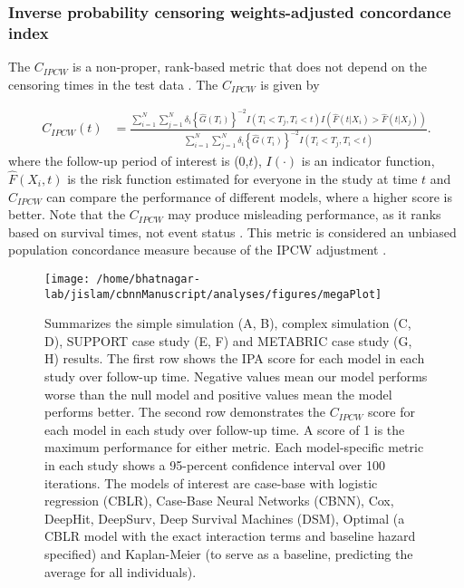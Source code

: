 \documentclass[AMA,STIX1COL,]{WileyNJD-v2}
\begin{document}
\hypertarget{inverse-probability-censoring-weights-adjusted-concordance-index}{%
\subsubsection{Inverse probability censoring weights-adjusted
concordance
index}\label{inverse-probability-censoring-weights-adjusted-concordance-index}}

The \(C_{IPCW}\) is a non-proper, rank-based metric that does not depend
on the censoring times in the test data \citep{uno2011}. The
\(C_{IPCW}\) is given by

\begin{align} \label{eq:cidx}
C_{IPCW}(t) &= \frac{\sum^{N}_{i=1}\sum^{N}_{j=1}\delta_{i}\left\{\widehat{G}(T_{i})\right\}^{-2} I(T_{i}<T_{j},T_{i}<t) I\left(\widehat{F}(t|X_{i})>\widehat{F}(t|X_{j})\right)}{\sum^{N}_{i=1}\sum^{N}_{j=1}\delta_{i}\left\{\widehat{G}(T_{i})\right\}^{-2} I(T_{i}<T_{j},T_{i}<t)}.
\end{align} where the follow-up period of interest is (0,\(t\)),
\(I(\cdot)\) is an indicator function, \(\widehat{F}(X_{i},t)\) is the
risk function estimated for everyone in the study at time \(t\) and
\(C_{IPCW}\) can compare the performance of different models, where a
higher score is better. Note that the \(C_{IPCW}\) may produce
misleading performance, as it ranks based on survival times, not event
status \citep{cindexfails2019}. This metric is considered an unbiased
population concordance measure because of the IPCW adjustment
\citep{uno2011}.

\begin{figure}

{\centering \texttt{[image: /home/bhatnagar-lab/jislam/cbnnManuscript/analyses/figures/megaPlot]} 

}

\caption{Summarizes the simple simulation (A, B), complex simulation (C, D), SUPPORT case study (E, F) and METABRIC case study (G, H) results. The first row shows the IPA score for each model in each study over follow-up time. Negative values mean our model performs worse than the null model and positive values mean the model performs better. The second row demonstrates the $C_{IPCW}$ score for each model in each study over follow-up time. A score of 1 is the maximum performance for either metric. Each model-specific metric in each study shows a 95-percent confidence interval over 100 iterations. The models of interest are case-base with logistic regression (CBLR), Case-Base Neural Networks (CBNN), Cox, DeepHit, DeepSurv, Deep Survival Machines (DSM), Optimal (a CBLR model with the exact interaction terms and baseline hazard specified) and Kaplan-Meier (to serve as a baseline, predicting the average for all individuals).}\label{fig:megaPlot}
\end{figure}
\end{document}
